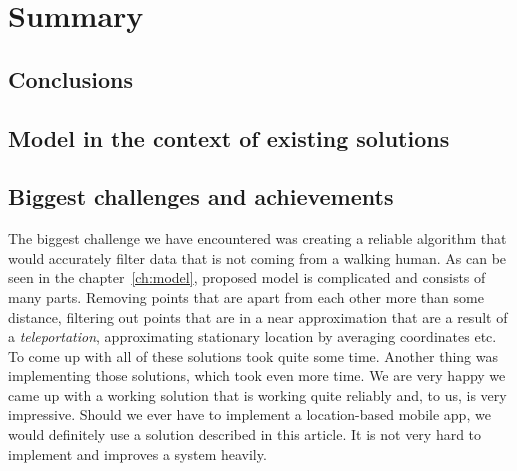 \chapter{Summary}
\section{Conclusions}

\section{Model in the context of existing solutions}

\section{Biggest challenges and achievements}
The biggest challenge we have encountered was creating a reliable algorithm that would accurately filter data that is not coming from a walking human. As can be seen in the chapter~\ref{ch:model}, proposed model is complicated and consists of many parts. Removing points that are apart from each other more than some distance, filtering out points that are in a near approximation that are a result of a \textit{teleportation}, approximating stationary location by averaging coordinates etc. To come up with all of these solutions took quite some time. Another thing was implementing those solutions, which took even more time. We are very happy we came up with a working solution that is working quite reliably and, to us, is very impressive. Should we ever have to implement a location-based mobile app, we would definitely use a solution described in this article. It is not very hard to implement and improves a system heavily.

